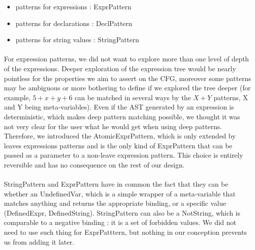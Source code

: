 \documentclass{report}
\begin{document}
\vspace{1.5mm}
\begin{itemize}
\item patterns for expressions : ExprPattern\vspace{1mm}
\item patterns for declarations : DeclPattern\vspace{1mm}
\item patterns for string values : StringPattern\vspace{1mm}
\end{itemize}

\paragraph{}
\hspace{4mm}For expression patterns, we did not want to explore more than one level of depth of the expressions.
Deeper exploration of the expression tree would be nearly pointless for the properties we aim to assert on the CFG, moreover
some patterns may be ambiguous or more bothering to define if we explored the tree deeper (for example, $5 + x + y + 6$ can be matched in several ways by the $X + Y$ patterns, 
X and Y being meta-variables). Even if the AST generated by an expression is deterministic, which makes deep pattern matching possible, we thought it was not very clear for the user
what he would get when using deep patterns. Therefore, we introduced the AtomicExprPattern, which is only extended by leaves expressions patterns and is the only kind of ExprPattern
that can be passed as a parameter to a non-leave expression pattern. This choice is entirely reversible and has no consequence on the rest of our design.

\paragraph{}
\hspace{4mm}StringPattern and ExprPattern have in common the fact that they can be whether an UndefinedVar, which is a simple wrapper of a meta-variable that matches anything
and returns the appropriate binding, or a specific value (DefinedExpr, DefinedString). StringPattern can also be a NotString, which is comparable to a negative binding : it is a set
of forbidden values. We did not need to use such thing for ExprPatttern, but nothing in our conception prevents us from adding it later.
\end{document}
